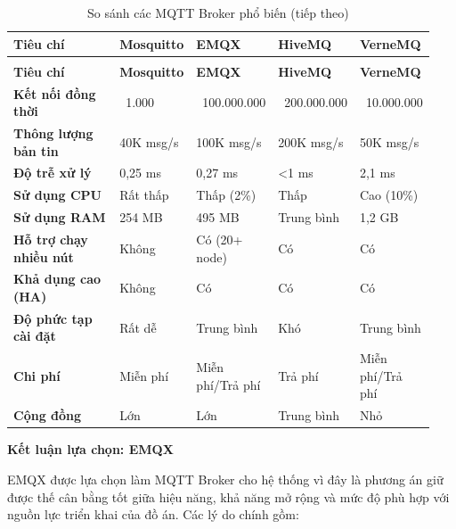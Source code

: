 \documentclass[a4paper]{extarticle}
\newcommand{\thesissettableid}[2]{%
  \renewcommand{\thetable}{#1}%
  \renewcommand{\theHtable}{#2}%
}
\begin{document}
{\thesissettableid{3.17}{tab-ch3-so-sanh-cac-mqtt-broker-pho-bien}
\def\LTcaptype{table}
\begin{longtable}{|L{0.269\linewidth}|L{0.188\linewidth}|L{0.158\linewidth}|L{0.152\linewidth}|L{0.177\linewidth}|}
\caption{So sánh các MQTT Broker phổ biến}\label{tab:ch3-so-sanh-cac-mqtt-broker-pho-bien}\\
\hline \textbf{Tiêu chí} & \textbf{Mosquitto} & \textbf{EMQX} & \textbf{HiveMQ} & \textbf{VerneMQ} \\
\hline
\endfirsthead
\caption[]{So sánh các MQTT Broker phổ biến (tiếp theo)}\\
\hline \textbf{Tiêu chí} & \textbf{Mosquitto} & \textbf{EMQX} & \textbf{HiveMQ} & \textbf{VerneMQ} \\
\hline
\endhead
\hline
\endfoot
\endlastfoot
\textbf{Kết nối đồng thời} & ~1.000 &
~100.000.000 & ~200.000.000 &
~10.000.000 \\\hline
\textbf{Thông lượng bản tin} & 40K msg/s & 100K msg/s & 200K msg/s & 50K
msg/s \\\hline
\textbf{Độ trễ xử lý} & 0,25 ms & 0,27 ms & \textless1 ms & 2,1
ms \\\hline
\textbf{Sử dụng CPU} & Rất thấp & Thấp (2\%) & Thấp & Cao (10\%) \\\hline
\textbf{Sử dụng RAM} & 254 MB & 495 MB & Trung bình & 1,2 GB \\\hline
\textbf{Hỗ trợ chạy nhiều nút} & Không & Có (20+ node) & Có & Có \\\hline
\textbf{Khả dụng cao (HA)} & Không & Có & Có & Có \\\hline
\textbf{Độ phức tạp cài đặt} & Rất dễ & Trung bình & Khó & Trung bình \\\hline
\textbf{Chi phí} & Miễn phí & Miễn phí/Trả phí & Trả phí & Miễn phí/Trả
phí \\\hline
\textbf{Cộng đồng} & Lớn & Lớn & Trung bình & Nhỏ \\\hline
\end{longtable}
}


\textbf{Kết luận lựa chọn: EMQX}

EMQX được lựa chọn làm MQTT Broker cho hệ thống vì đây là phương án giữ
được thế cân bằng tốt giữa hiệu năng, khả năng mở rộng và mức độ phù hợp
với nguồn lực triển khai của đồ án. Các lý do chính gồm:
\end{document}
